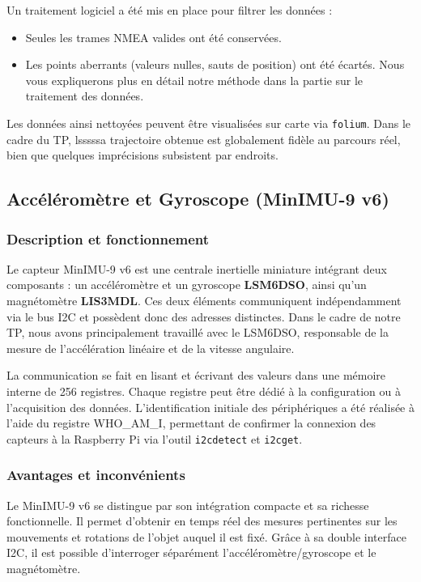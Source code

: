 Un traitement logiciel a été mis en place pour filtrer les données :

\begin{itemize}
    \item Seules les trames NMEA valides ont été conservées.
    \item Les points aberrants (valeurs nulles, sauts de position) ont été écartés. Nous vous expliquerons plus en détail notre méthode dans la partie sur le traitement des données.
\end{itemize}

Les données ainsi nettoyées peuvent être visualisées sur carte via \texttt{folium}. Dans le cadre du TP, lsssssa trajectoire obtenue est globalement fidèle au parcours réel, bien que quelques imprécisions subsistent par endroits.

\subsection{Accéléromètre et Gyroscope (MinIMU-9 v6)}

\subsubsection*{Description et fonctionnement}

Le capteur MinIMU-9 v6 est une centrale inertielle miniature intégrant deux composants : un accéléromètre et un gyroscope \textbf{LSM6DSO}, ainsi qu’un magnétomètre \textbf{LIS3MDL}. Ces deux éléments communiquent indépendamment via le bus I2C et possèdent donc des adresses distinctes. Dans le cadre de notre TP, nous avons principalement travaillé avec le LSM6DSO, responsable de la mesure de l’accélération linéaire et de la vitesse angulaire.

La communication se fait en lisant et écrivant des valeurs dans une mémoire interne de 256 registres. Chaque registre peut être dédié à la configuration ou à l’acquisition des données. L’identification initiale des périphériques a été réalisée à l’aide du registre WHO\_AM\_I, permettant de confirmer la connexion des capteurs à la Raspberry Pi via l’outil \texttt{i2cdetect} et \texttt{i2cget}.

\vspace{1em}
\subsubsection*{Avantages et inconvénients}

Le MinIMU-9 v6 se distingue par son intégration compacte et sa richesse fonctionnelle. Il permet d’obtenir en temps réel des mesures pertinentes sur les mouvements et rotations de l’objet auquel il est fixé. Grâce à sa double interface I2C, il est possible d’interroger séparément l’accéléromètre/gyroscope et le magnétomètre.

